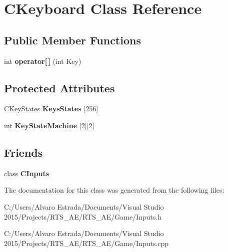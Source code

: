 \hypertarget{class_c_keyboard}{}\section{C\+Keyboard Class Reference}
\label{class_c_keyboard}
\subsection*{Public Member Functions}
\begin{DoxyCompactItemize}
\item 
int {\bfseries operator\mbox{[}$\,$\mbox{]}} (int Key)\hypertarget{class_c_keyboard_a923a4e319e1420b71d4c4cf97fa7afcf}{}\label{class_c_keyboard_a923a4e319e1420b71d4c4cf97fa7afcf}

\end{DoxyCompactItemize}
\subsection*{Protected Attributes}
\begin{DoxyCompactItemize}
\item 
\hyperlink{class_c_key_states}{C\+Key\+States} {\bfseries Keys\+States} \mbox{[}256\mbox{]}\hypertarget{class_c_keyboard_a095df23fb67c91b84dee3d34d2b97d0b}{}\label{class_c_keyboard_a095df23fb67c91b84dee3d34d2b97d0b}

\item 
int {\bfseries Key\+State\+Machine} \mbox{[}2\mbox{]}\mbox{[}2\mbox{]}\hypertarget{class_c_keyboard_acc3377f3dcac3988d0383a2680da8d71}{}\label{class_c_keyboard_acc3377f3dcac3988d0383a2680da8d71}

\end{DoxyCompactItemize}
\subsection*{Friends}
\begin{DoxyCompactItemize}
\item 
class {\bfseries C\+Inputs}\hypertarget{class_c_keyboard_a3c2f69d998627f792e2b16160b50e2ef}{}\label{class_c_keyboard_a3c2f69d998627f792e2b16160b50e2ef}

\end{DoxyCompactItemize}


The documentation for this class was generated from the following files\+:\begin{DoxyCompactItemize}
\item 
C\+:/\+Users/\+Alvaro Estrada/\+Documents/\+Visual Studio 2015/\+Projects/\+R\+T\+S\+\_\+\+A\+E/\+R\+T\+S\+\_\+\+A\+E/\+Game/Inputs.\+h\item 
C\+:/\+Users/\+Alvaro Estrada/\+Documents/\+Visual Studio 2015/\+Projects/\+R\+T\+S\+\_\+\+A\+E/\+R\+T\+S\+\_\+\+A\+E/\+Game/Inputs.\+cpp\end{DoxyCompactItemize}
